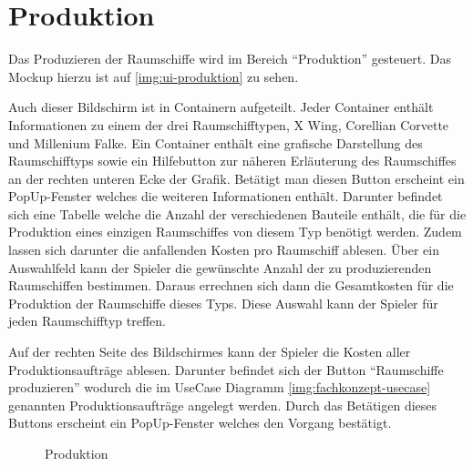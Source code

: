 \section{Produktion}
\label{sec:ui-produktion}


Das Produzieren der Raumschiffe wird im Bereich “Produktion” gesteuert. Das Mockup hierzu ist auf \vref{img:ui-produktion} zu sehen. 

Auch dieser Bildschirm ist in Containern aufgeteilt. Jeder Container enthält Informationen zu einem der drei Raumschifftypen, X Wing, Corellian Corvette und Millenium Falke. Ein Container enthält eine grafische Darstellung des Raumschifftyps sowie ein Hilfebutton zur näheren Erläuterung des Raumschiffes an der rechten unteren Ecke der Grafik. Betätigt man diesen Button erscheint ein PopUp-Fenster welches die weiteren Informationen enthält. Darunter befindet sich eine Tabelle welche die Anzahl der verschiedenen Bauteile enthält, die für die Produktion eines einzigen Raumschiffes von diesem Typ benötigt werden. Zudem lassen sich darunter die anfallenden Kosten pro Raumschiff ablesen. Über ein Auswahlfeld kann der Spieler die gewünschte Anzahl der zu produzierenden Raumschiffen bestimmen. Daraus errechnen sich dann die Gesamtkosten für die Produktion der Raumschiffe dieses Typs. Diese Auswahl kann der Spieler für jeden Raumschifftyp treffen.

Auf der rechten Seite des Bildschirmes kann der Spieler die Kosten aller Produktionsaufträge ablesen. Darunter befindet sich der Button “Raumschiffe produzieren” wodurch die im UseCase Diagramm \vref{img:fachkonzept-usecase} genannten Produktionsaufträge angelegt werden. Durch das Betätigen dieses Buttons erscheint ein PopUp-Fenster welches den Vorgang bestätigt. 

\begin{figure}[h]
  \centering
  \caption{Produktion}
  \label{img:ui-produktion}
\end{figure}

\autorende{}